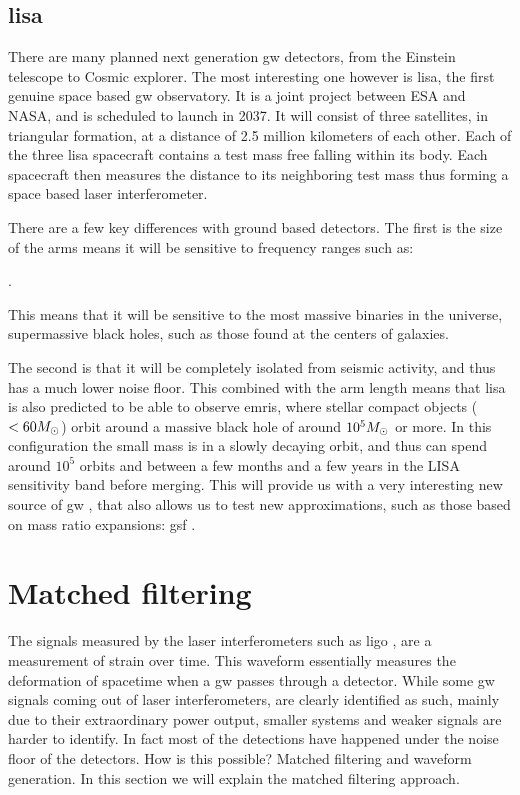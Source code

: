 \documentclass[
  10pt,
  a4paper,
  DIV=11,
  numbers=noendperiod,
  twoside]{scrreprt}
\let\[\relax \let\]\relax %
\DeclareRobustCommand{\[}{\begin{equation}}
\DeclareRobustCommand{\]}{\end{equation}}
\begin{document}
\hypertarget{lisa}{%
\subsection{\texorpdfstring{\gls{lisa}}{}}\label{lisa}}

There are many planned next generation \gls{gw} detectors, from the
Einstein telescope to Cosmic explorer. The most interesting one however
is \gls{lisa}, the first genuine space based \gls{gw} observatory. It is
a joint project between ESA and NASA, and is scheduled to launch in
2037. It will consist of three satellites, in triangular formation, at a
distance of 2.5 million kilometers of each other. Each of the three
\gls{lisa} spacecraft contains a test mass free falling within its body.
Each spacecraft then measures the distance to its neighboring test mass
thus forming a space based laser interferometer.

There are a few key differences with ground based detectors. The first
is the size of the arms means it will be sensitive to frequency ranges
such as:

\[
.
\]

This means that it will be sensitive to the most massive binaries in the
universe, supermassive black holes, such as those found at the centers
of galaxies.

The second is that it will be completely isolated from seismic activity,
and thus has a much lower noise floor. This combined with the arm length
means that \gls{lisa} is also predicted to be able to observe
\glspl{emri}, where stellar compact objects (\(<60 M_\odot\)) orbit
around a massive black hole of around \(10^5 M_\odot\) or more. In
this configuration the small mass is in a slowly decaying orbit, and
thus can spend around \(10^5\) orbits and between a few months and a few
years in the LISA sensitivity band before merging. This will provide us
with a very interesting new source of \gls{gw} , that also allows us to
test new approximations, such as those based on mass ratio expansions:
\gls{gsf} .

\hypertarget{matched-filtering}{%
\section{Matched filtering}\label{matched-filtering}}

The signals measured by the laser interferometers such as \gls{ligo} ,
are a measurement of strain over time. This waveform essentially
measures the deformation of spacetime when a \gls{gw} passes through a
detector. While some \gls{gw} signals coming out of laser
interferometers, are clearly identified as such, mainly due to their
extraordinary power output, smaller systems and weaker signals are
harder to identify. In fact most of the detections have happened under
the noise floor of the detectors. How is this possible? Matched
filtering and waveform generation. In this section we will explain the
matched filtering approach.
\end{document}

